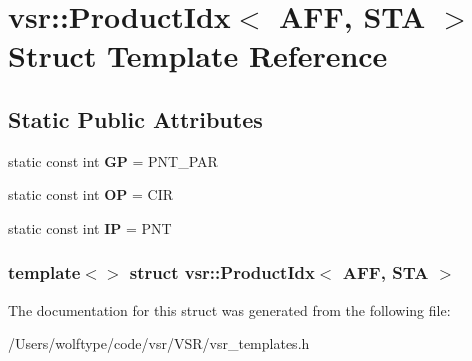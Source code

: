 \hypertarget{structvsr_1_1_product_idx_3_01_a_f_f_00_01_s_t_a_01_4}{\section{vsr\-:\-:Product\-Idx$<$ A\-F\-F, S\-T\-A $>$ Struct Template Reference}
\label{structvsr_1_1_product_idx_3_01_a_f_f_00_01_s_t_a_01_4}
}
\subsection*{Static Public Attributes}
\begin{DoxyCompactItemize}
\item 
\hypertarget{structvsr_1_1_product_idx_3_01_a_f_f_00_01_s_t_a_01_4_ac74259581ff5877b9c094a734b8d0f76}{static const int {\bfseries G\-P} = P\-N\-T\-\_\-\-P\-A\-R}\label{structvsr_1_1_product_idx_3_01_a_f_f_00_01_s_t_a_01_4_ac74259581ff5877b9c094a734b8d0f76}

\item 
\hypertarget{structvsr_1_1_product_idx_3_01_a_f_f_00_01_s_t_a_01_4_a9bc4e8476cc23634a10ad3a238a8c1a4}{static const int {\bfseries O\-P} = C\-I\-R}\label{structvsr_1_1_product_idx_3_01_a_f_f_00_01_s_t_a_01_4_a9bc4e8476cc23634a10ad3a238a8c1a4}

\item 
\hypertarget{structvsr_1_1_product_idx_3_01_a_f_f_00_01_s_t_a_01_4_a11152d0a1812429ddcbb86afa2fc9dcf}{static const int {\bfseries I\-P} = P\-N\-T}\label{structvsr_1_1_product_idx_3_01_a_f_f_00_01_s_t_a_01_4_a11152d0a1812429ddcbb86afa2fc9dcf}

\end{DoxyCompactItemize}
\subsubsection*{template$<$$>$ struct vsr\-::\-Product\-Idx$<$ A\-F\-F, S\-T\-A $>$}



The documentation for this struct was generated from the following file\-:\begin{DoxyCompactItemize}
\item 
/\-Users/wolftype/code/vsr/\-V\-S\-R/vsr\-\_\-templates.\-h\end{DoxyCompactItemize}
